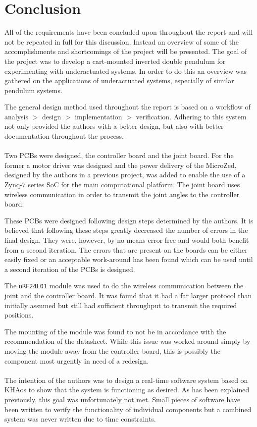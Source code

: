 \section{Conclusion} %
\label{sub:conclusion}
All of the requirements have been concluded upon throughout the report and  will not be repeated in full for this discussion.
Instead an overview of some of the accomplishments and shortcomings of the project will be presented.
The goal of the project was to develop a cart-mounted inverted double pendulum for experimenting with underactuated systems.
In order to do this an overview was gathered on the applications of underactuated systems, especially of similar pendulum systems.

The general design method used throughout the report is based on a workflow of analysis $>$ design $>$ implementation $>$ verification.
Adhering to this system not only provided the authors with a better design, but also with better documentation throughout the process.
\\~\\
Two PCBs were designed, the controller board and the joint board.
For the former a motor driver was designed and the power delivery of the MicroZed, designed by the authors in a previous project, was added to enable the use of a Zynq-7 series SoC for the main computational platform.
The joint board uses wireless communication in order to transmit the joint angles to the controller board.

These PCBs were designed following design steps determined by the authors.
It is believed that following these steps greatly decreased the number of errors in the final design.
They were, however, by no means error-free and would both benefit from a second iteration.
The errors that are present on the boards can be either easily fixed or an acceptable work-around has been found which can be used until a second iteration of the PCBs is designed.

The \texttt{nRF24L01} module was used to do the wireless communication between the joint and the controller board.
It was found that it had a far larger protocol than initially assumed but still had sufficient throughput to transmit the required positions.

The mounting of the module was found to not be in accordance with the recommendation of the datasheet.
While this issue was worked around simply by moving the module away from the controller board, this is possibly the component most urgently in need of a redesign.
\\~\\
The intention of the authors was to design a real-time software system based on KHAos to show that the system is functioning as desired.
As has been explained previously, this goal was unfortunately not met.
Small pieces of software have been written to verify the functionality of individual components but a combined system was never written due to time constraints.

